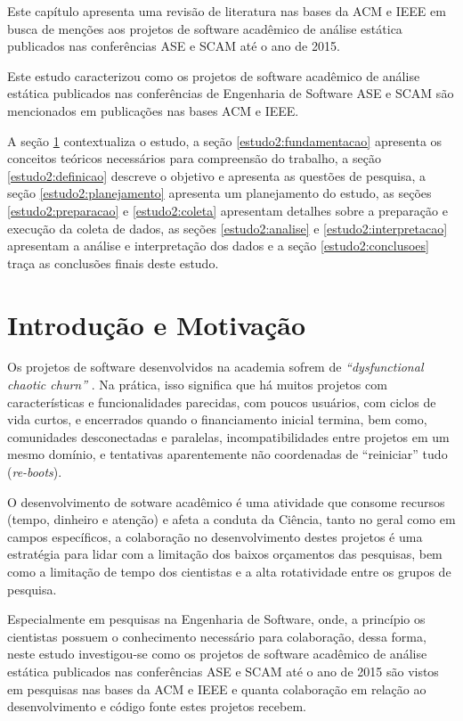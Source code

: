 {Este capítulo apresenta uma revisão de literatura nas bases da ACM e IEEE em
busca de menções aos projetos de software acadêmico de análise estática
publicados nas conferências ASE e SCAM até o ano de 2015.}
\label{estudo2}

Este estudo caracterizou como os projetos de software acadêmico de análise
estática publicados nas conferências de Engenharia de Software ASE e SCAM são
mencionados em publicações nas bases ACM e IEEE.

A seção \ref{estudo2:introducao} contextualiza o estudo,
a seção \ref{estudo2:fundamentacao} apresenta os conceitos teóricos necessários para compreensão do trabalho,
a seção \ref{estudo2:definicao} descreve o objetivo e apresenta as questões de pesquisa,
a seção \ref{estudo2:planejamento} apresenta um planejamento do estudo,
as seções \ref{estudo2:preparacao} e \ref{estudo2:coleta} apresentam detalhes sobre a preparação e execução da coleta de dados,
as seções \ref{estudo2:analise} e \ref{estudo2:interpretacao} apresentam a análise e interpretação dos dados e
a seção \ref{estudo2:conclusoes} traça as conclusões finais deste estudo.

\section{Introdução e Motivação} \label{estudo2:introducao} %

Os projetos de software desenvolvidos na academia sofrem de {\it
``dysfunctional chaotic churn''} \cite{howison2015understanding}.
Na prática, isso significa que há muitos projetos com características e
funcionalidades parecidas, com poucos usuários, com ciclos de vida curtos, e
encerrados quando o financiamento inicial termina, bem como, comunidades
desconectadas e paralelas, incompatibilidades entre projetos em um mesmo
domínio, e tentativas aparentemente não coordenadas de ``reiniciar'' tudo ({\it re-boots}). 

O desenvolvimento de sotware acadêmico é uma atividade que consome recursos
(tempo, dinheiro e atenção) e afeta a conduta da Ciência, tanto no geral como
em campos específicos, a colaboração no desenvolvimento destes projetos é uma
estratégia para lidar com a limitação dos baixos orçamentos das pesquisas, bem
como a limitação de tempo dos cientistas e a alta rotatividade entre os grupos
de pesquisa.

Especialmente em pesquisas na Engenharia de Software, onde, a princípio os
cientistas possuem o conhecimento necessário para colaboração, dessa forma,
neste estudo investigou-se como os projetos de software acadêmico de análise
estática publicados nas conferências ASE e SCAM até o ano de 2015 são vistos em
pesquisas nas bases da ACM e IEEE e quanta colaboração em relação ao
desenvolvimento e código fonte estes projetos recebem.

